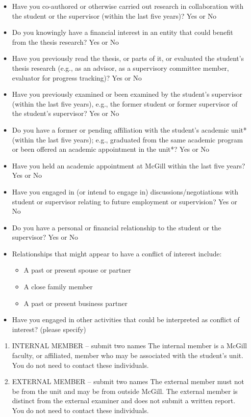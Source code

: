 \documentclass[
]{book}
\providecommand{\tightlist}{%
  \setlength{\itemsep}{0pt}\setlength{\parskip}{0pt}}
\begin{document}
\begin{itemize}
\tightlist
\item
  Have you co-authored or otherwise carried out research in collaboration with the student or the supervisor (within the last five years)? Yes or No
\item
  Do you knowingly have a financial interest in an entity that could benefit from the thesis research? Yes or No
\item
  Have you previously read the thesis, or parts of it, or evaluated the student's thesis research (e.g., as an advisor, as a supervisory committee member, evaluator for progress tracking)? Yes or No
\item
  Have you previously examined or been examined by the student's supervisor (within the last five years), e.g., the former student or former supervisor of the student's supervisor? Yes or No
\item
  Do you have a former or pending affiliation with the student's academic unit* (within the last five years); e.g., graduated from the same academic program or been offered an academic appointment in the unit*? Yes or No
\item
  Have you held an academic appointment at McGill within the last five years? Yes or No
\item
  Have you engaged in (or intend to engage in) discussions/negotiations with student or supervisor relating to future employment or supervision? Yes or No
\item
  Do you have a personal or financial relationship to the student or the supervisor? Yes or No
\item
  Relationships that might appear to have a conflict of interest include:

  \begin{itemize}
  \tightlist
  \item
    A past or present spouse or partner
  \item
    A close family member
  \item
    A past or present business partner
  \end{itemize}
\item
  Have you engaged in other activities that could be interpreted as conflict of interest? (please specify)
\end{itemize}

\begin{enumerate}
\def\labelenumi{\arabic{enumi}.}
\setcounter{enumi}{2}
\item
  INTERNAL MEMBER -- submit two names
  The internal member is a McGill faculty, or affiliated, member who may be associated with the student's unit. You do not need to contact these individuals.
\item
  EXTERNAL MEMBER -- submit two names
  The external member must not be from the unit and may be from outside McGill. The external member is distinct from the external examiner and does not submit a written report. You do not need to contact these individuals.
\end{enumerate}
\end{document}
